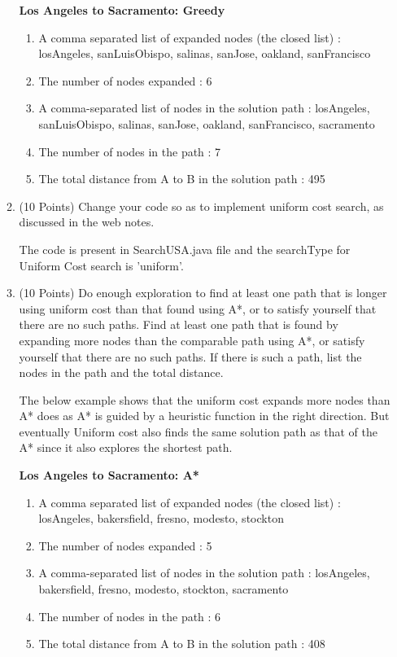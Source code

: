 \documentclass[letterpaper]{article}
\begin{document}
\begin{enumerate}
\begin{enumerate}
\begin{answer}
		\textbf{Los Angeles to Sacramento: Greedy}
		\begin{enumerate}
			\item A comma separated list of expanded nodes (the closed list) : 
			losAngeles, sanLuisObispo, salinas, sanJose, oakland, sanFrancisco
			\item The number of nodes expanded : 
			6
			\item A comma-separated list of nodes in the solution path :
			losAngeles, sanLuisObispo, salinas, sanJose, oakland, sanFrancisco,
			sacramento
			\item The number of nodes in the path : 
			7
			\item The total distance from A to B in the solution path : 
			495
		\end{enumerate}
	  \end{answer}
	  \bigskip
	  
	  \item (10 Points) Change your code so as to implement uniform cost search, as
	  discussed in the web notes.
	  \begin{answer}
		The code is present in SearchUSA.java file and the searchType for Uniform
		Cost search is 'uniform'.
	  \end{answer}	
		\bigskip
		
	  \item (10 Points) Do enough exploration to find at least one path that is
	  longer using uniform cost than that found using A*, or to satisfy yourself that there are no such paths. 
	  Find at least one path that is found by expanding more nodes than the comparable path using A*, 
	  or satisfy yourself that there are no such paths. 
	  If there is such a path, list the nodes in the path and the total distance.
	  \begin{answer}
	  	
	  	The below example shows that the uniform cost expands more nodes than A*
	  	does as A* is guided by a heuristic function in the right direction. But
	  	eventually Uniform cost also finds the same solution path as that of the A*
	  	since it also explores the shortest path. 
	  	\bigskip
	  	
	  	\textbf{Los Angeles to Sacramento: A*}
		\begin{enumerate}
			\item A comma separated list of expanded nodes (the closed list) : 
			losAngeles, bakersfield, fresno, modesto, stockton
			\item The number of nodes expanded : 
			5
			\item A comma-separated list of nodes in the solution path :
			losAngeles, bakersfield, fresno, modesto, stockton, sacramento
			\item The number of nodes in the path : 
			6
			\item The total distance from A to B in the solution path : 
			408
		\end{enumerate}
		\bigskip
		

\end{answer}
\end{enumerate}
\end{enumerate}
\end{document}
